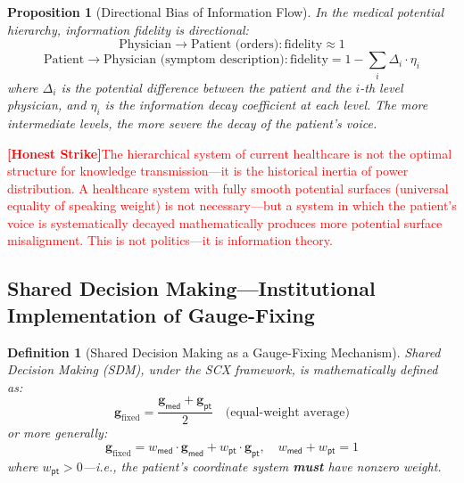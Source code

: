 \documentclass[12pt,a4paper]{article}
\newtheorem{proposition}[theorem]{Proposition}
\newtheorem{definition}[theorem]{Definition}
\theoremstyle{remark}
\newcommand{\med}{\textsf{med}}
\newcommand{\pt}{\textsf{pt}}
\newcommand{\honestcrit}[1]{%
    \textcolor{red}{\textbf{[Honest Strike]}#1}%
}
\begin{document}
\begin{proposition}[Directional Bias of Information Flow]\label{prop:info_asymmetry}
In the medical potential hierarchy, information fidelity is directional:
\begin{equation}
    \text{Physician} \to \text{Patient (orders)}: \text{fidelity} \approx 1
\end{equation}
\begin{equation}
    \text{Patient} \to \text{Physician (symptom description)}: \text{fidelity} = 1 - \sum_{i} \Delta_i \cdot \eta_i
\end{equation}
where $\Delta_i$ is the potential difference between the patient and the $i$-th level physician, and $\eta_i$ is the information decay coefficient at each level. The more intermediate levels, the more severe the decay of the patient's voice.
\end{proposition}

\honestcrit{The hierarchical system of current healthcare is not the optimal structure for knowledge transmission---it is the historical inertia of power distribution. A healthcare system with fully smooth potential surfaces (universal equality of speaking weight) is not necessary---but a system in which the patient's voice is systematically decayed mathematically produces more potential surface misalignment. This is not politics---it is information theory.}

\subsection{Shared Decision Making---Institutional Implementation of Gauge-Fixing}

\begin{definition}[Shared Decision Making as a Gauge-Fixing Mechanism]\label{def:shared_decision}
Shared Decision Making (SDM), under the SCX framework, is mathematically defined as:
\begin{equation}
    \mathbf{g}_{\text{fixed}} = \frac{\mathbf{g}_{\med} + \mathbf{g}_{\pt}}{2} \quad \text{(equal-weight average)}
\end{equation}
or more generally:
\begin{equation}
    \mathbf{g}_{\text{fixed}} = w_{\med} \cdot \mathbf{g}_{\med} + w_{\pt} \cdot \mathbf{g}_{\pt}, \quad w_{\med} + w_{\pt} = 1
\end{equation}
where $w_{\pt} > 0$---i.e., the patient's coordinate system \textbf{must} have nonzero weight.
\end{definition}
\end{document}
